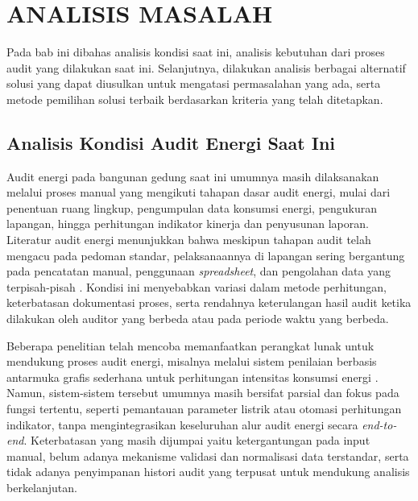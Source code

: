 \chapter{ANALISIS MASALAH}
\label{chap:analisis-masalah}

Pada bab ini dibahas analisis kondisi saat ini, analisis kebutuhan dari proses audit yang dilakukan saat ini. Selanjutnya, dilakukan analisis berbagai alternatif solusi yang dapat diusulkan untuk mengatasi permasalahan yang ada, serta metode pemilihan solusi terbaik berdasarkan kriteria yang telah ditetapkan.

\section{Analisis Kondisi Audit Energi Saat Ini}
Audit energi pada bangunan gedung saat ini umumnya masih dilaksanakan melalui proses manual yang mengikuti tahapan dasar audit energi, mulai dari penentuan ruang lingkup, pengumpulan data konsumsi energi, pengukuran lapangan, hingga perhitungan indikator kinerja dan penyusunan laporan. Literatur audit energi menunjukkan bahwa meskipun tahapan audit telah mengacu pada pedoman standar, pelaksanaannya di lapangan sering bergantung pada pencatatan manual, penggunaan \textit{spreadsheet}, dan pengolahan data yang terpisah-pisah \cite{hamdani2017audit,winarto2019audit,putra2025evaluasi}. Kondisi ini menyebabkan variasi dalam metode perhitungan, keterbatasan dokumentasi proses, serta rendahnya keterulangan hasil audit ketika dilakukan oleh auditor yang berbeda atau pada periode waktu yang berbeda.

Beberapa penelitian telah mencoba memanfaatkan perangkat lunak untuk mendukung proses audit energi, misalnya melalui sistem penilaian berbasis antarmuka grafis sederhana untuk perhitungan intensitas konsumsi energi \cite{hamdani2017audit,fitri2022sistem}. Namun, sistem-sistem tersebut umumnya masih bersifat parsial dan fokus pada fungsi tertentu, seperti pemantauan parameter listrik atau otomasi perhitungan indikator, tanpa mengintegrasikan keseluruhan alur audit energi secara \textit{end-to-end}. Keterbatasan yang masih dijumpai yaitu ketergantungan pada input manual, belum adanya mekanisme validasi dan normalisasi data terstandar, serta tidak adanya penyimpanan histori audit yang terpusat untuk mendukung analisis berkelanjutan.


